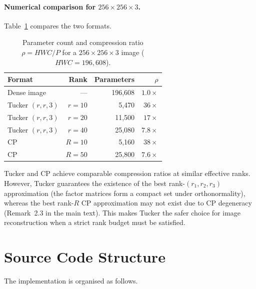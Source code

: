 \paragraph{Numerical comparison for $256 \times 256 \times 3$.}
Table~\ref{tab:app_params} compares the two formats.

\begin{table}[h]
  \centering
  \caption{Parameter count and compression ratio $\rho = HWC / P$ for a
           $256 \times 256 \times 3$ image ($HWC = 196{,}608$).}
  \label{tab:app_params}
  \begin{tabular}{lrrr}
    \toprule
    Format & Rank & Parameters & $\rho$ \\
    \midrule
    Dense image        & ---     & 196,608  & $1.0\times$ \\
    Tucker $(r,r,3)$   & $r=10$  & 5,470    & $36\times$  \\
    Tucker $(r,r,3)$   & $r=20$  & 11,500   & $17\times$  \\
    Tucker $(r,r,3)$   & $r=40$  & 25,080   & $7.8\times$ \\
    CP                 & $R=10$  & 5,160    & $38\times$  \\
    CP                 & $R=50$  & 25,800   & $7.6\times$ \\
    \bottomrule
  \end{tabular}
\end{table}

\noindent
Tucker and CP achieve comparable compression ratios at similar effective ranks.
However, Tucker guarantees the existence of the best rank-$(r_1,r_2,r_3)$
approximation (the factor matrices form a compact set under orthonormality),
whereas the best rank-$R$ CP approximation may not exist due to CP degeneracy
(Remark~2.3 in the main text).
This makes Tucker the safer choice for image reconstruction when a strict
rank budget must be satisfied.

\section{Source Code Structure}
\label{app:code}

The implementation is organised as follows.

